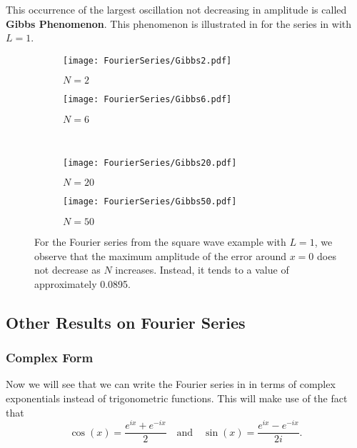 This occurrence of the largest oscillation not decreasing in amplitude is called \textbf{Gibbs Phenomenon}. This phenomenon is illustrated in  for the series in  with $L=1$.

\begin{figure}[!ht]
	\centering
	\begin{subfigure}[b]{0.49\textwidth}
		\centering
		\texttt{[image: FourierSeries/Gibbs2.pdf]}
		\caption{$N=2$}
	\end{subfigure}
	\hfill
	\begin{subfigure}[b]{0.49\textwidth}
		\centering
		\texttt{[image: FourierSeries/Gibbs6.pdf]}
		\caption{$N=6$}
	\end{subfigure}
	\\
	\begin{subfigure}[b]{0.49\textwidth}
		\centering
		\texttt{[image: FourierSeries/Gibbs20.pdf]}
		\caption{$N=20$}
	\end{subfigure}
	\hfill
	\begin{subfigure}[b]{0.49\textwidth}
		\centering
		\texttt{[image: FourierSeries/Gibbs50.pdf]}
		\caption{$N=50$}
	\end{subfigure}
	\caption{For the Fourier series from the square wave example with $L=1$, we observe that the maximum amplitude of the error around $x=0$ does not decrease as $N$ increases. Instead, it tends to a value of approximately 0.0895.\protect\footnotemark}
	\label{fig:gibbs}
\end{figure}


\subsection{Other Results on Fourier Series}

\subsubsection{Complex Form}\label{sec:fouriercomplex}

Now we will see that we can write the Fourier series in  in terms of complex exponentials instead of trigonometric functions. This will make use of the fact that
\[
\cos(x) = \frac{e^{ix} + e^{-ix}}{2} \quad \text{and} \quad \sin(x) = \frac{e^{ix} - e^{-ix}}{2i}.
\]

